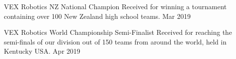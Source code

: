 
\begin{cvhonors}
	\cvhonor
	{VEX Robotics NZ National Champion}
	{Received for winning a tournament containing over 100 New Zealand high school teams.}
	{}
	{Mar 2019}


	\cvhonor
	{VEX Robotics World Championship Semi-Finalist}
	{Received for reaching the semi-finals of our division out of 150 teams from around the world, held in Kentucky USA.}
	{}
	{Apr 2019}
\end{cvhonors}